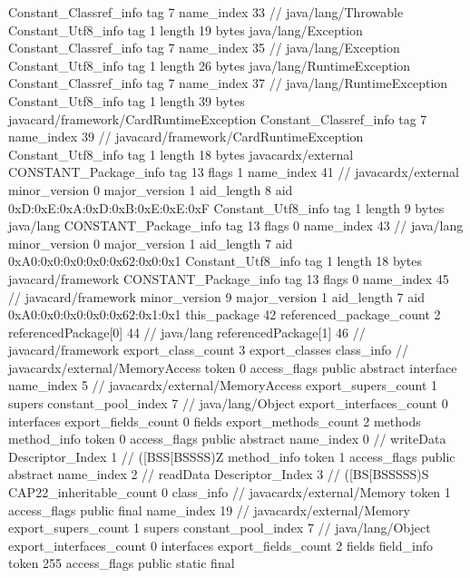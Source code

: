 {{{		}
		Constant_Classref_info {
			tag	7
			name_index	33		// java/lang/Throwable
		}
		Constant_Utf8_info {
			tag	1
			length	19
			bytes	java/lang/Exception
		}
		Constant_Classref_info {
			tag	7
			name_index	35		// java/lang/Exception
		}
		Constant_Utf8_info {
			tag	1
			length	26
			bytes	java/lang/RuntimeException
		}
		Constant_Classref_info {
			tag	7
			name_index	37		// java/lang/RuntimeException
		}
		Constant_Utf8_info {
			tag	1
			length	39
			bytes	javacard/framework/CardRuntimeException
		}
		Constant_Classref_info {
			tag	7
			name_index	39		// javacard/framework/CardRuntimeException
		}
		Constant_Utf8_info {
			tag	1
			length	18
			bytes	javacardx/external
		}
		CONSTANT_Package_info {
			tag	13
			flags	1
			name_index	41		// javacardx/external
			minor_version	0
			major_version	1
			aid_length	8
			aid	0xD:0xE:0xA:0xD:0xB:0xE:0xE:0xF
		}
		Constant_Utf8_info {
			tag	1
			length	9
			bytes	java/lang
		}
		CONSTANT_Package_info {
			tag	13
			flags	0
			name_index	43		// java/lang
			minor_version	0
			major_version	1
			aid_length	7
			aid	0xA0:0x0:0x0:0x0:0x62:0x0:0x1
		}
		Constant_Utf8_info {
			tag	1
			length	18
			bytes	javacard/framework
		}
		CONSTANT_Package_info {
			tag	13
			flags	0
			name_index	45		// javacard/framework
			minor_version	9
			major_version	1
			aid_length	7
			aid	0xA0:0x0:0x0:0x0:0x62:0x1:0x1
		}
	}
	this_package	42
	referenced_package_count	2
	referencedPackage[0]	44		// java/lang
	referencedPackage[1]	46		// javacard/framework
	export_class_count	3
	export_classes {
		class_info {		// javacardx/external/MemoryAccess
			token	0
			access_flags	public abstract interface
			name_index	5		// javacardx/external/MemoryAccess
			export_supers_count	1
			supers {
				constant_pool_index	7		// java/lang/Object
			}
			export_interfaces_count	0
			interfaces {
			}
			export_fields_count	0
			fields {
			}
			export_methods_count	2
			methods {
				method_info {
					token	0
					access_flags	public abstract
					name_index	0		// writeData
					Descriptor_Index	1		// ([BSS[BSSSS)Z
				}
				method_info {
					token	1
					access_flags	public abstract
					name_index	2		// readData
					Descriptor_Index	3		// ([BS[BSSSSS)S
				}
			}
			CAP22_inheritable_count	0
		}
		class_info {		// javacardx/external/Memory
			token	1
			access_flags	public final
			name_index	19		// javacardx/external/Memory
			export_supers_count	1
			supers {
				constant_pool_index	7		// java/lang/Object
			}
			export_interfaces_count	0
			interfaces {
			}
			export_fields_count	2
			fields {
			field_info {
				token	255
				access_flags	public static final
}}}}}
